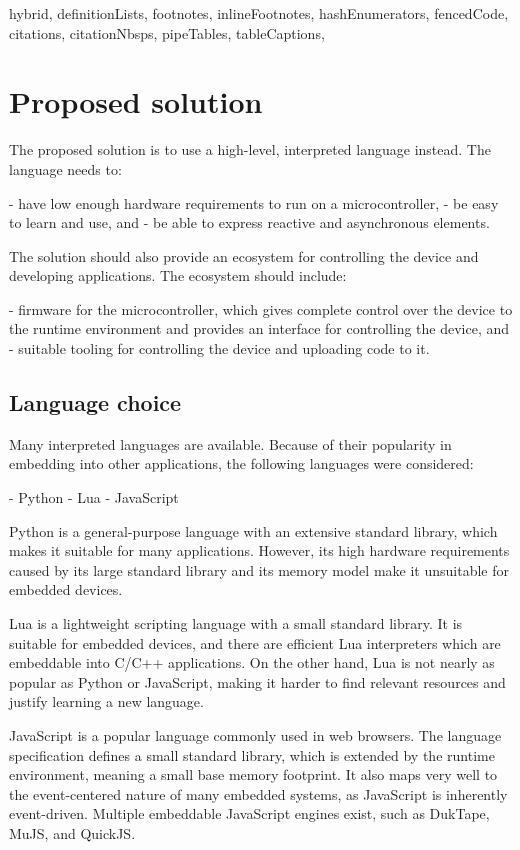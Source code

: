 \begin{markdown*}{%
  hybrid,
  definitionLists,
  footnotes,
  inlineFootnotes,
  hashEnumerators,
  fencedCode,
  citations,
  citationNbsps,
  pipeTables,
  tableCaptions,
}
\chapter{Proposed solution}

The proposed solution is to use a high-level, interpreted language instead. The language needs to:

  - have low enough hardware requirements to run on a microcontroller,
  - be easy to learn and use, and
  - be able to express reactive and asynchronous elements.

\noindent
The solution should also provide an ecosystem for controlling the device and developing applications. The ecosystem should include:

  - firmware for the microcontroller, which gives complete control over the device to the runtime environment and provides an interface for controlling the device, and
  - suitable tooling for controlling the device and uploading code to it.

\section{Language choice}

Many interpreted languages are available. Because of their popularity in embedding into other applications, the following languages were considered:

  - Python
  - Lua
  - JavaScript

Python is a general-purpose language with an extensive standard library, which makes it suitable for many applications. However, its high hardware requirements caused by its large standard library and its memory model make it unsuitable for embedded devices.

Lua is a lightweight scripting language with a small standard library. It is suitable for embedded devices, and there are efficient Lua interpreters which are embeddable into C/C++ applications. On the other hand, Lua is not nearly as popular as Python or JavaScript, making it harder to find relevant resources and justify learning a new language.

JavaScript is a popular language commonly used in web browsers. The language specification defines a small standard library, which is extended by the runtime environment, meaning a small base memory footprint. It also maps very well to the event-centered nature of many embedded systems, as JavaScript is inherently event-driven. Multiple embeddable JavaScript engines exist, such as DukTape, MuJS, and QuickJS.


\end{markdown*}
